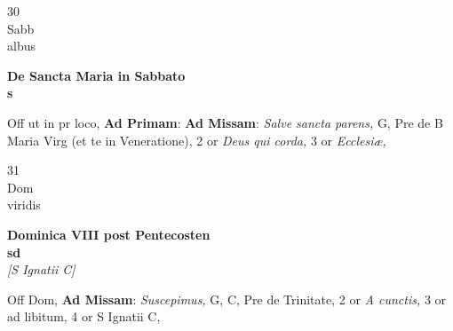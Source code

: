 \documentclass[10pt, openany]{book}
\begin{document}
        \begin{center}
            \begin{minipage}{3.5in}
                \vspace{2em}
                \begin{minipage}{0.5in}
                    {\Huge 30} \\
                    {\normalsize Sabb} \\
                    {\normalsize albus}
                \end{minipage}
                \begin{minipage}{3.0in}
                    \textbf{ \large De Sancta Maria in Sabbato \\
                    \textnormal{\normalsize s}} \\ 
                \end{minipage}
                \begin{justify}Off ut in pr loco, \textbf{Ad Primam}: \textbf{Ad Missam}: \textit{Salve sancta parens,} G, Pre de B Maria Virg (et te in Veneratione), 2 or \textit{Deus qui corda,} 3 or \textit{Ecclesiæ,}   
                \end{justify}
            \end{minipage}
        \end{center}
    
        \begin{center}
            \begin{minipage}{3.5in}
                \vspace{2em}
                \begin{minipage}{0.5in}
                    {\Huge 31} \\
                    {\normalsize Dom} \\
                    {\normalsize viridis}
                \end{minipage}
                \begin{minipage}{3.0in}
                    \textbf{ \large Dominica VIII post Pentecosten \\
                    \textnormal{\normalsize sd}} \\ \textit{[S Ignatii C]} \\ 
                \end{minipage}
                \begin{justify}Off Dom, \textbf{Ad Missam}: \textit{Suscepimus,} G, C, Pre de Trinitate, 2 or \textit{A cunctis,} 3 or ad libitum, 4 or S Ignatii C,   
                \end{justify}
            \end{minipage}
        \end{center}
    
\end{document}
